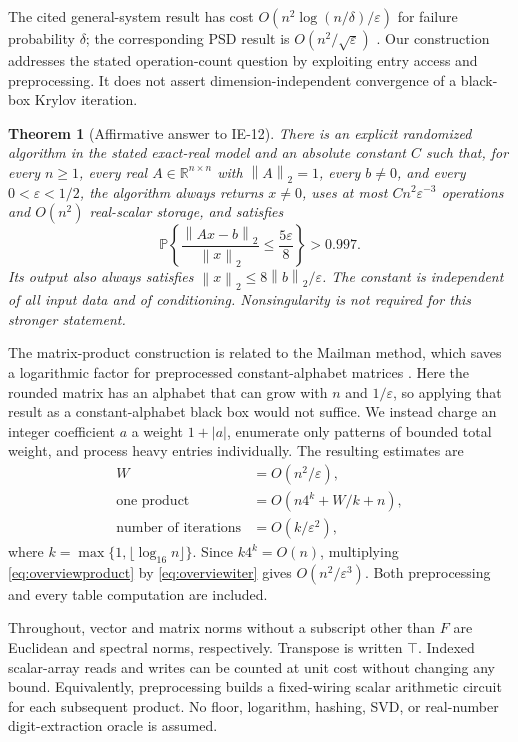 \documentclass[11pt,a4paper]{article}
\newtheorem{theorem}{Theorem}
\theoremstyle{remark}
\newcommand{\R}{\mathbb R}
\newcommand{\PP}{\mathbb P}
\newcommand{\eps}{\varepsilon}
\newcommand{\norm}[1]{\left\|#1\right\|_2}
\begin{document}
The cited general-system result has cost
$O(n^2\log(n/\delta)/\eps)$ for failure probability $\delta$; the corresponding
PSD result is $O(n^2/\sqrt\eps)$ \cite[Corollaries 17 and 25]{dnr}.
Our construction addresses the stated operation-count question by exploiting
entry access and preprocessing. It does not assert dimension-independent
convergence of a black-box Krylov iteration.

\begin{theorem}[Affirmative answer to IE-12]\label{thm:main}
There is an explicit randomized algorithm in the stated exact-real model and
an absolute constant $C$ such that, for every $n\ge1$, every real
$A\in\R^{n\times n}$ with $\norm{A}=1$, every $b\ne0$, and every
$0<\eps<1/2$, the algorithm always returns $x\ne0$, uses at most
$Cn^2\eps^{-3}$ operations and $O(n^2)$ real-scalar storage, and satisfies
\begin{equation}\label{eq:main}
 \PP\!\left\{\frac{\norm{Ax-b}}{\norm{x}}\le\frac{5\eps}{8}\right\}>0.997.
\end{equation}
Its output also always satisfies $\norm{x}\le8\norm{b}/\eps$.
The constant is independent of all input data and of conditioning.
Nonsingularity is not required for this stronger statement.
\end{theorem}

The matrix-product construction is related to the Mailman method, which saves
a logarithmic factor for preprocessed constant-alphabet matrices
\cite{mailman}. Here the rounded matrix has an alphabet that can grow with
$n$ and $1/\eps$, so applying that result as a constant-alphabet black box
would not suffice. We instead charge an integer coefficient $a$ a weight
$1+|a|$, enumerate only patterns of bounded total weight, and process heavy
entries individually. The resulting estimates are
\begin{align}
 W&=O(n^2/\eps),\label{eq:overviewW}\\
 \text{one product}&=O(n4^k+W/k+n),\label{eq:overviewproduct}\\
 \text{number of iterations}&=O(k/\eps^2),\label{eq:overviewiter}
\end{align}
where $k=\max\{1,\lfloor\log_{16}n\rfloor\}$. Since $k4^k=O(n)$,
multiplying \eqref{eq:overviewproduct} by \eqref{eq:overviewiter} gives
$O(n^2/\eps^3)$. Both preprocessing and every table computation are included.

Throughout, vector and matrix norms without a subscript other than $F$ are
Euclidean and spectral norms, respectively. Transpose is written $\top$.
Indexed scalar-array reads and writes can be counted at unit cost without
changing any bound. Equivalently, preprocessing builds a fixed-wiring scalar
arithmetic circuit for each subsequent product. No floor, logarithm, hashing,
SVD, or real-number digit-extraction oracle is assumed.
\end{document}
